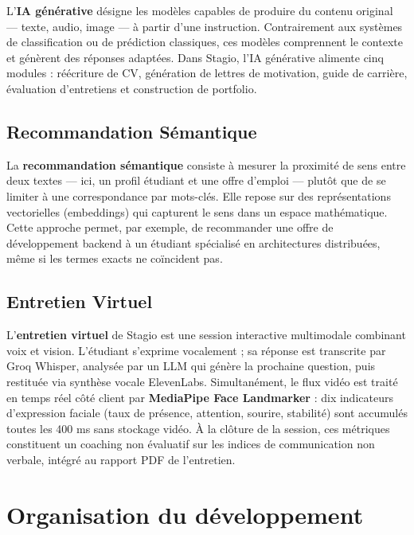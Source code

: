 ﻿\documentclass[12pt,a4paper]{report}
\begin{document}
L'\textbf{IA générative} désigne les modèles capables de produire du contenu original — texte, audio, image — à partir d'une instruction. Contrairement aux systèmes de classification ou de prédiction classiques, ces modèles comprennent le contexte et génèrent des réponses adaptées. Dans Stagio, l'IA générative alimente cinq modules : réécriture de CV, génération de lettres de motivation, guide de carrière, évaluation d'entretiens et construction de portfolio.

\subsection{Recommandation Sémantique}

La \textbf{recommandation sémantique} consiste à mesurer la proximité de sens entre deux textes — ici, un profil étudiant et une offre d'emploi — plutôt que de se limiter à une correspondance par mots-clés. Elle repose sur des représentations vectorielles (embeddings) qui capturent le sens dans un espace mathématique. Cette approche permet, par exemple, de recommander une offre de développement backend à un étudiant spécialisé en architectures distribuées, même si les termes exacts ne coïncident pas.

\subsection{Entretien Virtuel}

L'\textbf{entretien virtuel} de Stagio est une session interactive multimodale combinant voix et vision. L'étudiant s'exprime vocalement ; sa réponse est transcrite par Groq Whisper, analysée par un LLM qui génère la prochaine question, puis restituée via synthèse vocale ElevenLabs. Simultanément, le flux vidéo est traité en temps réel côté client par \textbf{MediaPipe Face Landmarker} : dix indicateurs d'expression faciale (taux de présence, attention, sourire, stabilité) sont accumulés toutes les 400 ms sans stockage vidéo. À la clôture de la session, ces métriques constituent un coaching non évaluatif sur les indices de communication non verbale, intégré au rapport PDF de l'entretien.

\section{Organisation du développement}
\end{document}
